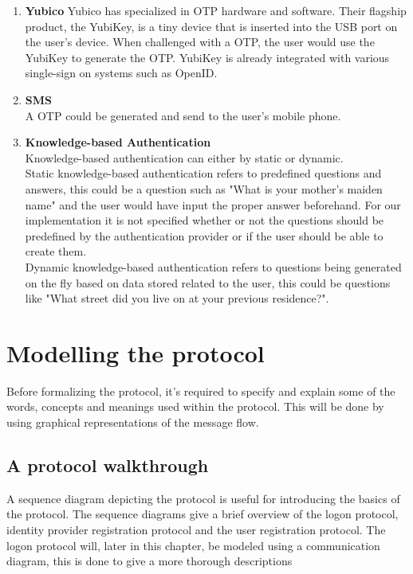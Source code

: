 \documentclass[twosided]{report}
\begin{document}
\begin{enumerate}
	\item[] \textbf{Yubico}
		Yubico has specialized in OTP hardware and software. Their flagship product, the YubiKey, is a tiny device that is inserted into the USB port on the user's device. When challenged with a OTP, the user would use the YubiKey to generate the OTP. YubiKey is already integrated with various single-sign on systems such as OpenID.
	\item[] \textbf{SMS}\\
		A OTP could be generated and send to the user's mobile phone.
	\item[] \textbf{Knowledge-based Authentication}\\
		Knowledge-based authentication can either by static or dynamic.\\
		Static knowledge-based authentication refers to predefined questions and answers, this could be a question such as "What is your mother's maiden name" and the user would have input the proper answer beforehand. For our implementation it is not specified whether or not the questions should be predefined by the authentication provider or if the user should be able to create them.\\
		Dynamic knowledge-based authentication refers to questions being generated on the fly based on data stored related to the user, this could be questions like "What street did you live on at your previous residence?". 
\end{enumerate}

\chapter{Modelling the protocol}
\label{chap:modelspecify}
Before formalizing the protocol, it's required to specify and explain some of the words, concepts and meanings used within the protocol. This will be done by using graphical representations of the message flow.

\section{A protocol walkthrough}
A sequence diagram depicting the protocol is useful for introducing the basics of the protocol. The sequence diagrams give a brief overview of the logon protocol, identity provider registration protocol and the user registration protocol. The logon protocol will, later in this chapter, be modeled using a communication diagram, this is done to give a more thorough descriptions
\end{document}

